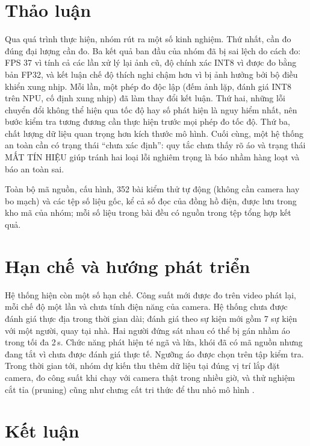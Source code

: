 \documentclass[11pt,a4paper,twocolumn]{article}
\begin{document}
\section{Thảo luận}

Qua quá trình thực hiện, nhóm rút ra một số kinh nghiệm. Thứ nhất, cần đo đúng đại lượng cần đo. Ba kết quả ban đầu của nhóm đã bị sai lệch do cách đo: FPS 37 vì tính cả các lần xử lý lại ảnh
cũ, độ chính xác INT8 vì được đo bằng bản FP32, và kết luận chế độ thích nghi chậm hơn vì bị ảnh hưởng bởi bộ điều khiển xung nhịp. Mỗi lần, một phép đo độc lập (đếm ảnh lặp, đánh giá INT8 trên NPU,
cố định xung nhịp) đã làm thay đổi kết luận. Thứ hai, những lỗi chuyển đổi không thể hiện qua tốc độ hay số phát hiện là nguy hiểm nhất, nên bước kiểm tra tương đương cần thực hiện trước mọi phép
đo tốc độ. Thứ ba, chất lượng dữ liệu quan trọng hơn kích thước mô hình. Cuối cùng, một hệ thống an toàn cần có trạng thái ``chưa xác định'': quy tắc chưa thấy rõ áo và trạng thái MẤT TÍN HIỆU giúp
tránh hai loại lỗi nghiêm trọng là báo nhầm hàng loạt và báo an toàn sai.

Toàn bộ mã nguồn, cấu hình, 352 bài kiểm thử tự động (không cần camera hay bo mạch) và các tệp số liệu gốc, kể cả số đọc của đồng hồ điện, được lưu trong kho mã của nhóm; mỗi số liệu trong bài đều có
nguồn trong tệp tổng hợp kết quả.

\section{Hạn chế và hướng phát triển}

Hệ thống hiện còn một số hạn chế. Công suất mới được đo trên video phát lại, mỗi chế độ một lần và chưa tính điện năng của camera. Hệ thống chưa được đánh giá thực địa trong thời gian dài;
đánh giá theo sự kiện mới gồm 7 sự kiện với một người, quay tại nhà. Hai người đứng sát nhau có thể bị gán nhầm áo trong tối đa 2\,s. Chức năng phát hiện té ngã và lửa, khói đã có mã nguồn nhưng
đang tắt vì chưa được đánh giá thực tế. Ngưỡng áo được chọn trên tập kiểm tra. Trong thời gian tới, nhóm dự kiến thu thêm dữ liệu tại đúng vị trí lắp đặt camera, đo công suất khi chạy với camera thật
trong nhiều giờ, và thử nghiệm cắt tỉa (pruning) cũng như chưng cất tri thức để thu nhỏ mô hình \cite{han}.

\section{Kết luận}
\end{document}
